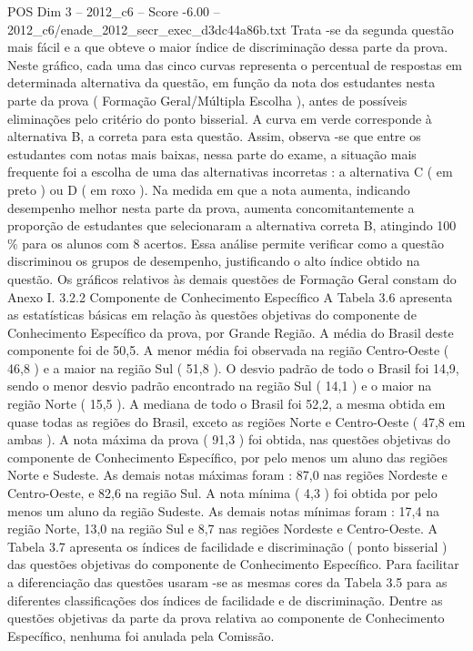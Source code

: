 \begin{textsample}{POS Dim 3 – 2012\_c6 – Score -6.00 – 2012\_c6/enade\_2012\_secr\_exec\_d3dc44a86b.txt}
Trata -se da segunda questão mais fácil e a que obteve o maior índice de discriminação dessa parte da prova.
Neste gráfico, cada uma das cinco curvas representa o percentual de respostas em determinada alternativa da questão, em função da nota dos estudantes nesta parte da prova ( Formação Geral/Múltipla Escolha ), antes de possíveis eliminações pelo critério do ponto bisserial.
A curva em verde corresponde à alternativa B, a correta para esta questão.
Assim, observa -se que entre os estudantes com notas mais baixas, nessa parte do exame, a situação mais frequente foi a escolha de uma das alternativas incorretas : a alternativa C ( em preto ) ou D ( em roxo ).
Na medida em que a nota aumenta, indicando desempenho melhor nesta parte da prova, aumenta concomitantemente a proporção de estudantes que selecionaram a alternativa correta B, atingindo 100 \% para os alunos com 8 acertos.
Essa análise permite verificar como a questão discriminou os grupos de desempenho, justificando o alto índice obtido na questão.
Os gráficos relativos às demais questões de Formação Geral constam do Anexo I. 3.2.2 Componente de Conhecimento Específico A Tabela 3.6 apresenta as estatísticas básicas em relação às questões objetivas do componente de Conhecimento Específico da prova, por Grande Região.
A média do Brasil deste componente foi de 50,5.
A menor média foi observada na região Centro-Oeste ( 46,8 ) e a maior na região Sul ( 51,8 ).
O desvio padrão de todo o Brasil foi 14,9, sendo o menor desvio padrão encontrado na região Sul ( 14,1 ) e o maior na região Norte ( 15,5 ).
A mediana de todo o Brasil foi 52,2, a mesma obtida em quase todas as regiões do Brasil, exceto as regiões Norte e Centro-Oeste ( 47,8 em ambas ).
A nota máxima da prova ( 91,3 ) foi obtida, nas questões objetivas do componente de Conhecimento Específico, por pelo menos um aluno das regiões Norte e Sudeste.
As demais notas máximas foram : 87,0 nas regiões Nordeste e Centro-Oeste, e 82,6 na região Sul.
A nota mínima ( 4,3 ) foi obtida por pelo menos um aluno da região Sudeste.
As demais notas mínimas foram : 17,4 na região Norte, 13,0 na região Sul e 8,7 nas regiões Nordeste e Centro-Oeste.
A Tabela 3.7 apresenta os índices de facilidade e discriminação ( ponto bisserial ) das questões objetivas do componente de Conhecimento Específico.
Para facilitar a diferenciação das questões usaram -se as mesmas cores da Tabela 3.5 para as diferentes classificações dos índices de facilidade e de discriminação.
Dentre as questões objetivas da parte da prova relativa ao componente de Conhecimento Específico, nenhuma foi anulada pela Comissão.

\end{textsample}
